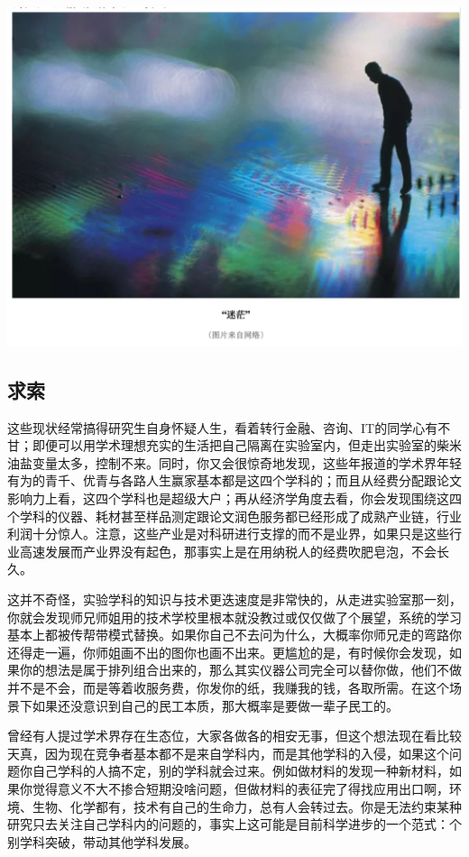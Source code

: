 \documentclass[
]{book}
\begin{document}
\includegraphics[width=6.67in]{images/hhcs4}

\hypertarget{ux6c42ux7d22}{%
\subsection{求索}\label{ux6c42ux7d22}}

这些现状经常搞得研究生自身怀疑人生，看着转行金融、咨询、IT的同学心有不甘；即便可以用学术理想充实的生活把自己隔离在实验室内，但走出实验室的柴米油盐变量太多，控制不来。同时，你又会很惊奇地发现，这些年报道的学术界年轻有为的青千、优青与各路人生赢家基本都是这四个学科的；而且从经费分配跟论文影响力上看，这四个学科也是超级大户；再从经济学角度去看，你会发现围绕这四个学科的仪器、耗材甚至样品测定跟论文润色服务都已经形成了成熟产业链，行业利润十分惊人。注意，这些产业是对科研进行支撑的而不是业界，如果只是这些行业高速发展而产业界没有起色，那事实上是在用纳税人的经费吹肥皂泡，不会长久。

这并不奇怪，实验学科的知识与技术更迭速度是非常快的，从走进实验室那一刻，你就会发现师兄师姐用的技术学校里根本就没教过或仅仅做了个展望，系统的学习基本上都被传帮带模式替换。如果你自己不去问为什么，大概率你师兄走的弯路你还得走一遍，你师姐画不出的图你也画不出来。更尴尬的是，有时候你会发现，如果你的想法是属于排列组合出来的，那么其实仪器公司完全可以替你做，他们不做并不是不会，而是等着收服务费，你发你的纸，我赚我的钱，各取所需。在这个场景下如果还没意识到自己的民工本质，那大概率是要做一辈子民工的。

曾经有人提过学术界存在生态位，大家各做各的相安无事，但这个想法现在看比较天真，因为现在竞争者基本都不是来自学科内，而是其他学科的入侵，如果这个问题你自己学科的人搞不定，别的学科就会过来。例如做材料的发现一种新材料，如果你觉得意义不大不掺合短期没啥问题，但做材料的表征完了得找应用出口啊，环境、生物、化学都有，技术有自己的生命力，总有人会转过去。你是无法约束某种研究只去关注自己学科内的问题的，事实上这可能是目前科学进步的一个范式：个别学科突破，带动其他学科发展。
\end{document}
